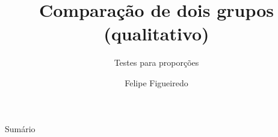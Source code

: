 \documentclass{beamer}
\title%
{Comparação de dois grupos (qualitativo)}
\subtitle
{Testes para proporções} %
\author%
{Felipe Figueiredo}%
\institute[INTO] %
{Instituto Nacional de Traumatologia e Ortopedia
}
\date%
{}
\begin{document}
\begin{frame}
  \titlepage
\end{frame}

\begin{frame}{Sumário}
  \tableofcontents
\end{frame}








\end{document}
